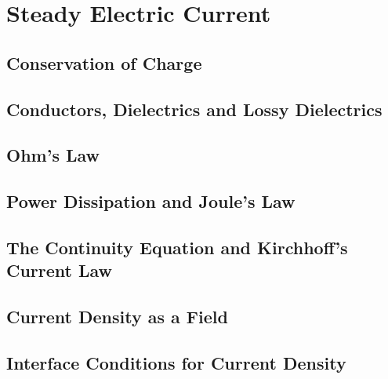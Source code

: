 \section{Steady Electric Current}

\subsection{Conservation of Charge}

\subsection{Conductors, Dielectrics and Lossy Dielectrics}

\subsection{Ohm's Law}

\subsection{Power Dissipation and Joule's Law}

\subsection{The Continuity Equation and Kirchhoff's Current Law}

\subsection{Current Density as a Field}

\subsection{Interface Conditions for Current Density}
